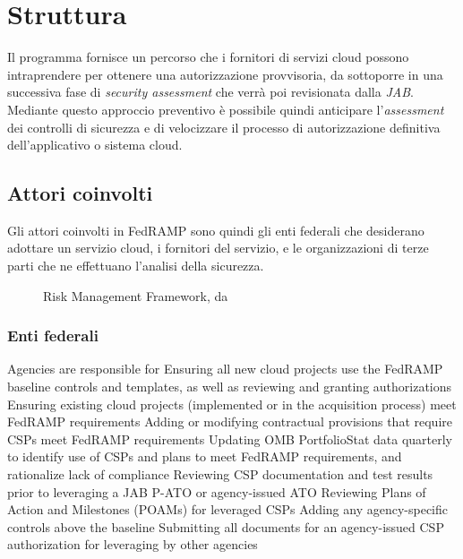 \documentclass[../main.tex]{subfiles}
\begin{document}
\section{Struttura}
Il programma fornisce un percorso che i fornitori di servizi cloud possono intraprendere per ottenere una autorizzazione provvisoria, da sottoporre in una successiva fase di \textit{security assessment} che verrà poi revisionata dalla \textit{JAB}.
Mediante questo approccio preventivo è possibile quindi anticipare l'\textit{assessment} dei controlli di sicurezza e di velocizzare il processo di autorizzazione definitiva dell'applicativo o sistema cloud.

\vfill
\subsection{Attori coinvolti}
Gli attori coinvolti in FedRAMP sono quindi gli enti federali che desiderano adottare un servizio cloud, i fornitori del servizio, e le organizzazioni di terze parti che ne effettuano l'analisi della sicurezza.

\begin{figure}[H]
\centering
{}
\caption{Risk Management Framework, da \cite{} }\label{fig:fedrampactors}
\end{figure}



\subsubsection{Enti federali}
Agencies are responsible for
Ensuring all new cloud projects use the FedRAMP baseline controls and templates, as well as reviewing and granting authorizations
Ensuring existing cloud projects (implemented or in the acquisition process) meet FedRAMP requirements
Adding or modifying contractual provisions that require CSPs meet FedRAMP requirements
Updating OMB PortfolioStat data quarterly to identify use of CSPs and plans to meet FedRAMP requirements, and rationalize lack of compliance
Reviewing CSP documentation and test results prior to leveraging a JAB P-ATO or agency-issued ATO
Reviewing Plans of Action and Milestones (POAMs) for leveraged CSPs
Adding any agency-specific controls above the baseline
Submitting all documents for an agency-issued CSP authorization for leveraging by other agencies
\end{document}

